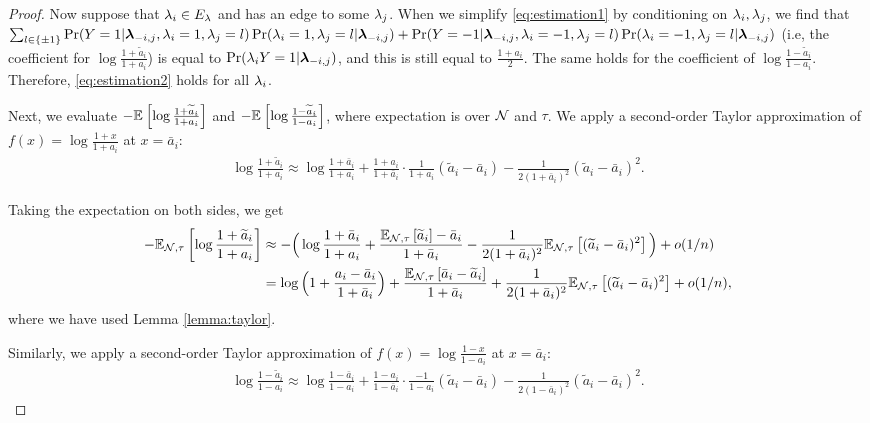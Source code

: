 \begin{proof}
Now suppose that $\lambda_i \in E_{\lambda}$ and has an edge to some $\lambda_j$. When we simplify \eqref{eq:estimation1} by conditioning on $\lambda_i, \lambda_j$, we find that $\sum_{l \in \{\pm 1\}}\Pr(Y = 1 | \bm{\lambda}_{-i, j}, \lambda_i = 1, \lambda_j = l) \Pr(\lambda_i = 1, \lambda_j = l | \bm{\lambda}_{-i, j}) + \Pr(Y = -1 | \bm{\lambda}_{-i, j}, \lambda_i = -1, \lambda_j = l) \Pr(\lambda_i = -1, \lambda_j = l | \bm{\lambda}_{-i, j} )$ (i.e, the coefficient for $\log \frac{1 + \widetilde{a}_i}{1 + a_i}$) is equal to $\Pr(\lambda_i Y = 1 | \bm{\lambda}_{-i, j})$, and this is still equal to $\frac{1 + a_i}{2}$. The same holds for the coefficient of $\log \frac{1 - \widetilde{a}_i}{1 - a_i}$. Therefore, \eqref{eq:estimation2} holds for all $\lambda_i$.

Next, we evaluate $-\mathbb{E}_{}\left[\log \frac{1 + \widetilde{a}_i}{1 + a_i}\right]$ and $-\mathbb{E}_{}\left[\log \frac{1 - \widetilde{a}_i}{1 - a_i}\right]$, where expectation is over $\mathcal{N}$ and $\tau$. We apply a second-order Taylor approximation of $f(x) = \log \frac{1 + x}{1 + a_i}$ at $x = \bar{a}_i$:
\begin{align*}
\log \frac{1 + \widetilde{a}_i}{1 + a_i} \approx \log \frac{1 + \bar{a}_i}{1 + a_i} + \frac{1 + a_i}{1 + \bar{a}_i} \cdot \frac{1}{1 + a_i} (\widetilde{a}_i - \bar{a}_i) - \frac{1}{2(1 + \bar{a}_i)^2} (\widetilde{a}_i - \bar{a}_i)^2.
\end{align*}


Taking the expectation on both sides, we get 
\begin{align*}
-\mathbb{E}_{\mathcal{N}, \tau}\left[\log \frac{1 + \widetilde{a}_i}{1 + a_i}\right] &\approx -\Big(\log \frac{1 + \bar{a}_i}{1 + a_i} + \frac{\mathbb{E}_{\mathcal{N}, \tau}\left[\widetilde{a}_i\right] - \bar{a}_i}{1 + \bar{a}_i} - \frac{1}{2(1 + \bar{a}_i)^2} \mathbb{E}_{\mathcal{N}, \tau}\left[(\widetilde{a}_i - \bar{a}_i)^2\right]\Big) + o(1/n) \\
&= \log \Big(1 + \frac{a_i - \bar{a}_i}{1 + \bar{a}_i} \Big) + \frac{\mathbb{E}_{\mathcal{N}, \tau}\left[\bar{a}_i - \widetilde{a}_i\right]}{1 + \bar{a}_i} + \frac{1}{2(1 + \bar{a}_i)^2} \mathbb{E}_{\mathcal{N}, \tau}\left[(\widetilde{a}_i - \bar{a}_i)^2\right] + o(1/n),
\end{align*}
where we have used Lemma \ref{lemma:taylor}. 

Similarly, we apply a second-order Taylor approximation of $f(x) = \log \frac{1 - x}{1 - a_i}$ at $x = \bar{a}_i$:
\begin{align*}
\log \frac{1 - \widetilde{a}_i}{1 - a_i} \approx \log \frac{1 - \bar{a}_i}{1 - a_i} + \frac{1 - a_i}{1 - \bar{a}_i} \cdot \frac{-1}{1 - a_i} (\widetilde{a}_i - \bar{a}_i) - \frac{1}{2(1 - \bar{a}_i)^2} (\widetilde{a}_i - \bar{a}_i)^2.
\end{align*}


\end{proof}
